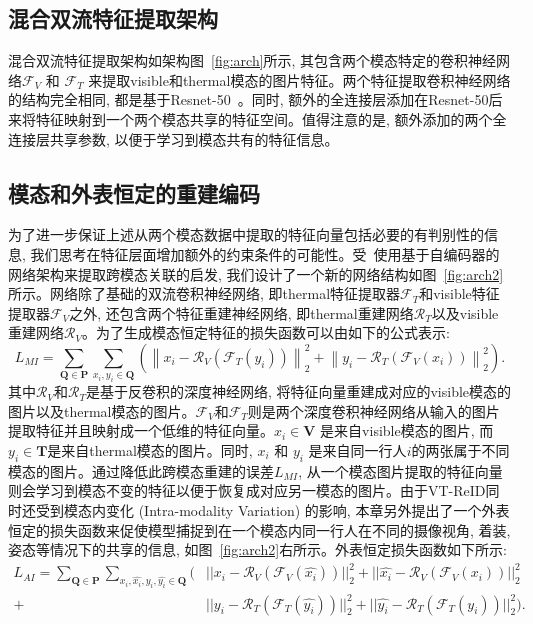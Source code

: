 \subsection{混合双流特征提取架构}
混合双流特征提取架构如架构图~\ref{fig:arch}所示, 其包含两个模态特定的卷积神经网络$\mathcal{F}_V$ 和 $\mathcal{F}_T$ 来提取visible和thermal模态的图片特征。两个特征提取卷积神经网络的结构完全相同, 都是基于Resnet-50~\cite{he2016deep}。同时, 额外的全连接层添加在Resnet-50后来将特征映射到一个两个模态共享的特征空间。值得注意的是, 额外添加的两个全连接层共享参数, 以便于学习到模态共有的特征信息。
\subsection{模态和外表恒定的重建编码}
为了进一步保证上述从两个模态数据中提取的特征向量包括必要的有判别性的信息, 我们思考在特征层面增加额外的约束条件的可能性。受~\cite{cao2016correlation}使用基于自编码器的网络架构来提取跨模态关联的启发, 我们设计了一个新的网络结构如图~\ref{fig:arch2}所示。网络除了基础的双流卷积神经网络, 即thermal特征提取器$\mathcal{F}_T$和visible特征提取器$\mathcal{F}_V$之外, 还包含两个特征重建神经网络, 即thermal重建网络$\mathcal{R}_T$以及visible重建网络$\mathcal{R}_V$。为了生成模态恒定特征的损失函数可以由如下的公式表示: 
\begin{equation}
  L_{M I}=\sum_{\mathbf{Q} \in \mathbf{P}} \sum_{x_i, y_i \in \mathbf{Q}}\left(\left\|x_i-\mathcal{R}_V\left(\mathcal{F}_T\left(y_i\right)\right)\right\|_2^2+\left\|y_i-\mathcal{R}_T\left(\mathcal{F}_V\left(x_i\right)\right)\right\|_2^2\right).
  \label{eq:MI_loss}
\end{equation} 
其中$\mathcal{R}_V$和$\mathcal{R}_T$是基于反卷积的深度神经网络, 将特征向量重建成对应的visible模态的图片以及thermal模态的图片。$\mathcal{F}_V$和$\mathcal{F}_T$则是两个深度卷积神经网络从输入的图片提取特征并且映射成一个低维的特征向量。$x_i \in \mathbf{V}$ 是来自visible模态的图片, 而$y_i \in \mathbf{T}$是来自thermal模态的图片。同时, $x_i$ 和 $y_i$ 是来自同一行人$i$的两张属于不同模态的图片。通过降低此跨模态重建的误差$L_{M I}$, 从一个模态图片提取的特征向量则会学习到模态不变的特征以便于恢复成对应另一模态的图片。由于VT-ReID同时还受到模态内变化 (Intra-modality Variation) 的影响, 本章另外提出了一个外表恒定的损失函数来促使模型捕捉到在一个模态内同一行人在不同的摄像视角, 着装, 姿态等情况下的共享的信息, 如图~\ref{fig:arch2}右所示。外表恒定损失函数如下所示:
\begin{equation}
  \begin{aligned}
  L_{AI} = \sum_{\mathbf{Q} \in \mathbf{P}}\sum_{x_i,\hat{x_i},y_i,\hat{y_i} \in \mathbf{Q}}(&||x_i - \mathcal{R}_V(\mathcal{F}_V(\hat{x_i}))||_2^2+
      ||\hat{x_i} - \mathcal{R}_V(\mathcal{F}_V(x_i))||_2^2  \\
      +&||y_i - \mathcal{R}_T(\mathcal{F}_T(\hat{y_i}))||_2^2+ 
      ||\hat{y_i} -\mathcal{R}_T(\mathcal{F}_T(y_i))||_2^2).
  \end{aligned}
  \label{eq:AI_loss}
  \end{equation}
